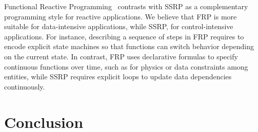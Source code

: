 \documentclass{sigplanconf}
\newcommand{\CEU}{\textsc{C\'{e}u}\xspace}
\newcommand{\1}{\;}
\newcommand{\2}{\;\;}
\newcommand{\3}{\;\;\;}
\newcommand{\5}{\;\;\;\;\;}
\begin{document}
Functional Reactive Programming~\cite{frp.principles} contrasts with SSRP as a
complementary programming style for reactive applications.
%
We believe that FRP is more suitable for data-intensive applications, while 
SSRP, for control-intensive applications.
%
For instance, describing a sequence of steps in FRP requires to encode explicit 
state machines so that functions can switch behavior depending on the current 
state.
%
In contrast, FRP uses declarative formulas to specify continuous functions over 
time, such as for physics or data constraints among entities, while SSRP 
requires explicit loops to update data dependencies continuously.

\section{Conclusion}
\label{sec.conclusion}

\end{document}
